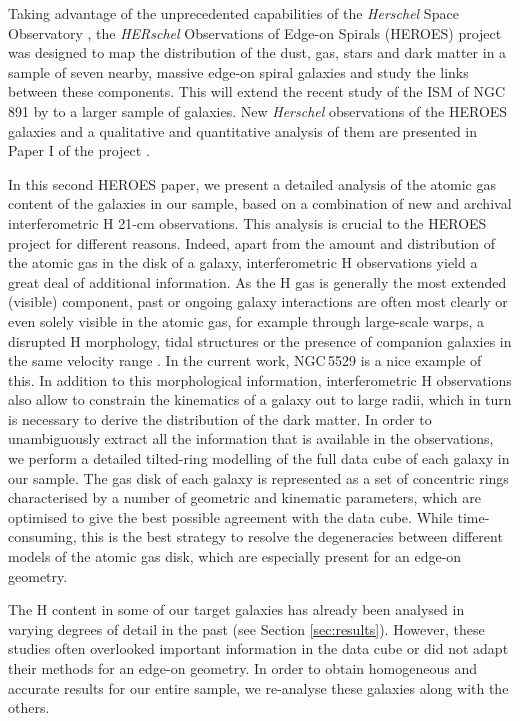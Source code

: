 \documentclass{aa}
\begin{document}
\par
Taking advantage of the unprecedented capabilities of the {\it Herschel} Space Observatory \citep{pilbratt10}, the {\it HERschel} Observations of Edge-on Spirals (HEROES) project was designed to map the distribution of the dust, gas, stars and dark matter in a sample of seven nearby, massive edge-on spiral galaxies and study the links between these components. This will extend the recent study of the ISM of NGC\,891 by \cite{hughes14} to a larger sample of galaxies. New {\it Herschel} observations of the HEROES galaxies and a qualitative and quantitative analysis of them are presented in Paper I of the project \citep{verstappen13}. 
\par
In this second HEROES paper, we present a detailed analysis of the atomic gas content of the galaxies in our sample, based on a combination of new and archival interferometric H{} 21-cm observations. This analysis is crucial to the HEROES project for different reasons. Indeed, apart from the amount and distribution of the atomic gas in the disk of a galaxy, interferometric H{} observations yield a great deal of additional information. As the H{} gas is generally the most extended (visible) component, past or ongoing galaxy interactions are often most clearly or even solely visible in the atomic gas, for example through large-scale warps, a disrupted H{} morphology, tidal structures or the presence of companion galaxies in the same velocity range \citep[e.g.][]{kamphuis92,yun94,sancisi99,holwerda11}. In the current work, NGC\,5529 is a nice example of this. In addition to this morphological information, interferometric H{} observations also allow to constrain the kinematics of a galaxy out to large radii, which in turn is necessary to derive the distribution of the dark matter. In order to unambiguously extract all the information that is available in the observations, we perform a detailed tilted-ring modelling of the full data cube of each galaxy in our sample. The gas disk of each galaxy is represented as a set of concentric rings characterised by a number of geometric and kinematic parameters, which are optimised to give the best possible agreement with the data cube. While time-consuming, this is the best strategy to resolve the degeneracies between different models of the atomic gas disk, which are especially present for an edge-on geometry.
\par
The H{} content in some of our target galaxies has already been analysed in varying degrees of detail in the past (see Section \ref{sec:results}). However, these studies often overlooked important information in the data cube or did not adapt their methods for an edge-on geometry. In order to obtain homogeneous and accurate results for our entire sample, we re-analyse these galaxies along with the others.
\end{document}
